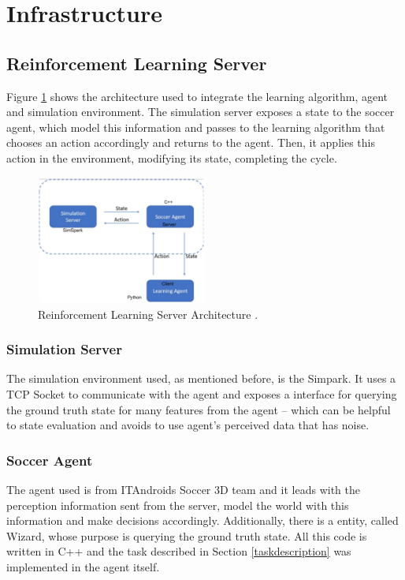 \section{Infrastructure}
\subsection{Reinforcement Learning Server}\label{rlarchitecture}

Figure \ref{rlserver} shows the architecture used to integrate the learning algorithm, agent and simulation environment. The simulation server exposes a state to the soccer agent, which model this information and passes to the learning algorithm that chooses an action accordingly and returns to the agent. Then, it applies this action in the environment, modifying its state, completing the cycle.

\begin{figure}[!htbp]
	\centering
	\includegraphics[width=0.5\textwidth]{Cap5/rlserver.eps}
	\caption{Reinforcement Learning Server Architecture
		\cite{tgmuzio}.
	}
	\label{rlserver}
\end{figure}

\subsubsection{Simulation Server}

The simulation environment used, as mentioned before, is the Simpark. It uses a TCP Socket to communicate with the agent and exposes a interface for querying the ground truth state for many features from the agent -- which can be helpful to state evaluation and avoids to use agent's perceived data that has noise. 

\subsubsection{Soccer Agent}
The agent used is from ITAndroids Soccer 3D team and it leads with the perception information sent from the server, model the world with this information and make decisions accordingly. Additionally, there is a entity, called Wizard, whose purpose is querying the ground truth state. All this code is written in C++ and the task described in Section \ref{taskdescription} was implemented in the agent itself.

